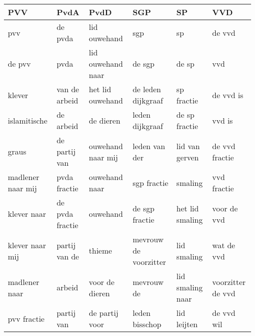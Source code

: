 \begin{tabular}{llllll}
\toprule
               PVV &             PvdA &               PvdD &                    SGP &                SP &                VVD \\
\midrule
               pvv &          de pvda &       lid ouwehand &                    sgp &                sp &             de vvd \\
            de pvv &             pvda &  lid ouwehand naar &                 de sgp &             de sp &                vvd \\
            klever &    van de arbeid &   het lid ouwehand &     de leden dijkgraaf &        sp fractie &          de vvd is \\
      islamitische &        de arbeid &          de dieren &        leden dijkgraaf &     de sp fractie &             vvd is \\
             graus &    de partij van &  ouwehand naar mij &          leden van der &    lid van gerven &     de vvd fractie \\
 madlener naar mij &     pvda fractie &      ouwehand naar &            sgp fractie &           smaling &        vvd fractie \\
       klever naar &  de pvda fractie &           ouwehand &         de sgp fractie &   het lid smaling &        voor de vvd \\
   klever naar mij &    partij van de &             thieme &  mevrouw de voorzitter &       lid smaling &         wat de vvd \\
     madlener naar &           arbeid &     voor de dieren &             mevrouw de &  lid smaling naar &  voorzitter de vvd \\
       pvv fractie &       partij van &     de partij voor &         leden bisschop &       lid leijten &         de vvd wil \\
\bottomrule
\end{tabular}
